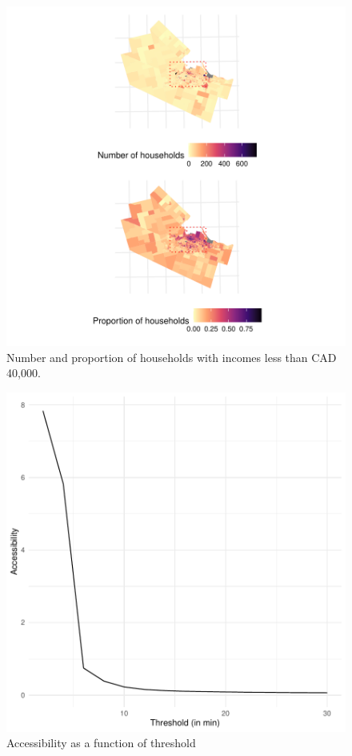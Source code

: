\documentclass[]{elsarticle} %
\begin{document}
\begin{figure}
\includegraphics[width=1\linewidth]{Accessibility-Foodbanks-Hamilton_files/figure-latex/plot-low-income-households-1} \caption{\label{fig:low-income-households}Number and proportion of households with incomes less than CAD 40,000.}\label{fig:plot-low-income-households}
\end{figure}

\begin{figure}
\includegraphics[width=1\linewidth]{Accessibility-Foodbanks-Hamilton_files/figure-latex/plot-results-sensitivity-analysis-1} \caption{\label{fig:sensitivity-analysis}Accessibility as a function of threshold}\label{fig:plot-results-sensitivity-analysis}
\end{figure}
\end{document}
